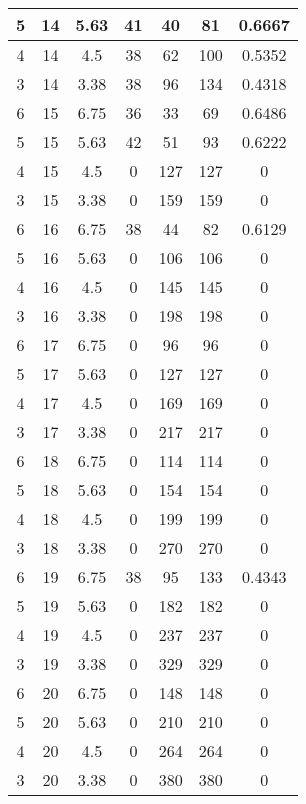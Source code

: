 \documentclass[letterpaper, 12pt]{article}
\begin{document}
\begin{longtable}{|c|c|c|c|c|c|c|}
\hline
5 & 14 & 5.63 & 41 & 40 & 81 & 0.6667 \\
\hline
4 & 14 & 4.5 & 38 & 62 & 100 & 0.5352 \\
\hline
3 & 14 & 3.38 & 38 & 96 & 134 & 0.4318 \\
\hline
6 & 15 & 6.75 & 36 & 33 & 69 & 0.6486 \\
\hline
5 & 15 & 5.63 & 42 & 51 & 93 & 0.6222 \\
\hline
4 & 15 & 4.5 & 0 & 127 & 127 & 0 \\
\hline
3 & 15 & 3.38 & 0 & 159 & 159 & 0 \\
\hline
6 & 16 & 6.75 & 38 & 44 & 82 & 0.6129 \\
\hline
5 & 16 & 5.63 & 0 & 106 & 106 & 0 \\
\hline
4 & 16 & 4.5 & 0 & 145 & 145 & 0 \\
\hline
3 & 16 & 3.38 & 0 & 198 & 198 & 0 \\
\hline
6 & 17 & 6.75 & 0 & 96 & 96 & 0 \\
\hline
5 & 17 & 5.63 & 0 & 127 & 127 & 0 \\
\hline
4 & 17 & 4.5 & 0 & 169 & 169 & 0 \\
\hline
3 & 17 & 3.38 & 0 & 217 & 217 & 0 \\
\hline
6 & 18 & 6.75 & 0 & 114 & 114 & 0 \\
\hline
5 & 18 & 5.63 & 0 & 154 & 154 & 0 \\
\hline
4 & 18 & 4.5 & 0 & 199 & 199 & 0 \\
\hline
3 & 18 & 3.38 & 0 & 270 & 270 & 0 \\
\hline
6 & 19 & 6.75 & 38 & 95 & 133 & 0.4343 \\
\hline
5 & 19 & 5.63 & 0 & 182 & 182 & 0 \\
\hline
4 & 19 & 4.5 & 0 & 237 & 237 & 0 \\
\hline
3 & 19 & 3.38 & 0 & 329 & 329 & 0 \\
\hline
6 & 20 & 6.75 & 0 & 148 & 148 & 0 \\
\hline
5 & 20 & 5.63 & 0 & 210 & 210 & 0 \\
\hline
4 & 20 & 4.5 & 0 & 264 & 264 & 0 \\
\hline
3 & 20 & 3.38 & 0 & 380 & 380 & 0 \\
\hline
\end{longtable}
\end{document}
